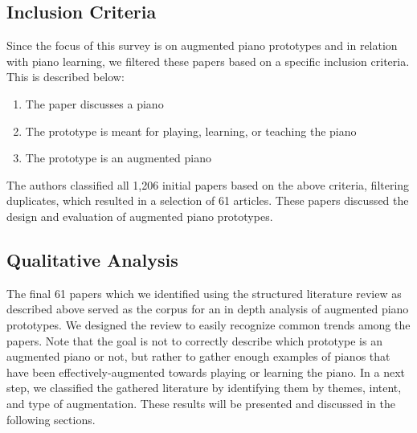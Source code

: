 \documentclass[sigconf, screen, review]{acmart}
\begin{document}
\subsection{Inclusion Criteria}
Since the focus of this survey is on augmented piano prototypes and in relation with piano learning, we filtered these papers based on a specific inclusion criteria. This is described below: 
\begin{enumerate}
    \item The paper discusses a piano
    \item The prototype is meant for playing, learning, or teaching the piano
    \item The prototype is an augmented piano 
\end{enumerate}
The authors classified all 1,206 initial papers based on the above criteria, filtering duplicates, which resulted in a selection of 61 articles. These papers discussed the design and evaluation of augmented piano prototypes. 

\subsection{Qualitative Analysis}
The final 61 papers which we identified using the structured literature review as described above served as the corpus for an in depth analysis of augmented piano prototypes. We designed the review to easily recognize common trends among the papers. Note that the goal is not to correctly describe which prototype is an augmented piano or not, but rather to gather enough examples of pianos that have been effectively-augmented towards playing or learning the piano.  In a next step, we classified the gathered literature by identifying them by themes, intent, and type of augmentation. These results will be presented and discussed in the following sections. 
\end{document}
